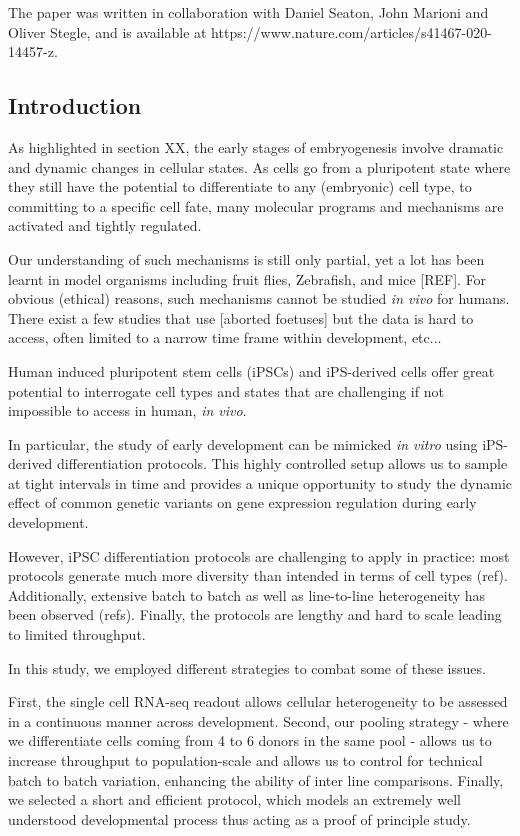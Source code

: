 \vspace{5mm}

\noindent The paper was written in collaboration with Daniel Seaton, John Marioni and Oliver Stegle, and is available at https://www.nature.com/articles/s41467-020-14457-z.

\subsection{Introduction}

As highlighted in section XX, the early stages of embryogenesis involve dramatic and dynamic changes in cellular states. As cells go from a pluripotent state where they still have the potential to differentiate to any (embryonic) cell type, to committing to a specific cell fate, many molecular programs and mechanisms are activated and tightly regulated.

Our understanding of such mechanisms is still only partial, yet a lot has been learnt in model organisms including fruit flies, Zebrafish, and mice [REF]. For obvious (ethical) reasons, such mechanisms cannot be studied \textit{in vivo} for humans. There exist a few studies that use [aborted foetuses] but the data is hard to access, often limited to a narrow time frame within development, etc...

Human induced pluripotent stem cells (iPSCs) and iPS-derived cells offer great potential to interrogate cell types and states that are challenging if not impossible to access in human, \textit{in vivo}.

In particular, the study of early development can be mimicked \textit{in vitro} using iPS-derived differentiation protocols. This highly controlled setup allows us to sample at tight intervals in time and provides a unique opportunity to study the dynamic effect of common genetic variants on gene expression regulation during early development.

However, iPSC differentiation protocols are challenging to apply in practice: most protocols generate much more diversity than intended in terms of cell types (ref). Additionally, extensive batch to batch as well as line-to-line heterogeneity has been observed (refs). Finally, the protocols are lengthy and hard to scale leading to limited throughput. 
 
In this study, we employed different strategies to combat some of these issues. 

First, the single cell RNA-seq readout allows cellular heterogeneity to be assessed in a continuous manner across development.
Second, our pooling strategy - where we differentiate cells coming from 4 to 6 donors in the same pool - allows us to increase throughput to population-scale and allows us to control for technical batch to batch variation, enhancing the ability of inter line comparisons.
Finally, we selected a short and efficient protocol, which models an extremely well understood developmental process thus acting as a proof of principle study.

